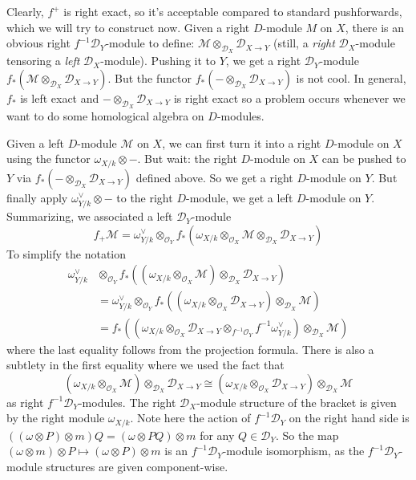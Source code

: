 \documentclass[11pt, a4paper]{article}
\theoremstyle{definition}
\newcommand{\w}[0]{\omega}
\begin{document}
    Clearly, $f^+$ is right exact, so it's acceptable compared to standard pushforwards, which we will try to construct now. Given a right $D$-module $M$ on $X$, there is an obvious right $f^{-1}\mathcal D_Y$-module to define: $\mathcal M\otimes_{\mathcal D_X}\mathcal D_{X\to Y}$ (still, a \textit{right} $\mathcal D_X$-module tensoring a \textit{left} $\mathcal D_X$-module). Pushing it to $Y$, we get a right $\mathcal D_Y$-module $f_*(\mathcal M\otimes_{\mathcal D_X}\mathcal D_{X\to Y})$. But the functor $f_*(-\otimes_{\mathcal D_X}\mathcal D_{X\to Y})$ is not cool. In general, $f_*$ is left exact and $-\otimes_{\mathcal D_X}\mathcal D_{X\to Y}$ is right exact so a problem occurs whenever we want to do some homological algebra on $D$-modules.

    Given a left $D$-module $\mathcal M$ on $X$, we can first turn it into a right $D$-module on $X$ using the functor $\w_{X/k}\otimes-$. But wait: the right $D$-module on $X$ can be pushed to $Y$ via $f_*(-\otimes_{\mathcal D_X}\mathcal D_{X\to Y})$ defined above. So we get a right $D$-module on $Y$. But finally apply $\w_{Y/k}^\vee\otimes-$ to the right $D$-module, we get a left $D$-module on $Y$. Summarizing, we associated a left $\mathcal D_Y$-module
    \[f_+\mathcal M=\w_{Y/k}^\vee\otimes_{\mathcal O_Y}f_*(\w_{X/k}\otimes_{\mathcal O_X} \mathcal M\otimes_{\mathcal D_X}\mathcal D_{X\to Y})\]
    To simplify the notation
    \begin{align*}
        \w_{Y/k}^\vee&\otimes_{\mathcal O_Y}f_*((\w_{X/k}\otimes_{\mathcal O_X} \mathcal M)\otimes_{\mathcal D_X}\mathcal D_{X\to Y})\\
        &=\w_{Y/k}^\vee\otimes_{\mathcal O_Y}f_*((\w_{X/k}\otimes_{\mathcal O_X}\mathcal D_{X\to Y})\otimes_{\mathcal D_X} \mathcal M)\\
        &=f_*((\w_{X/k}\otimes_{\mathcal O_X}\mathcal D_{X\to Y}\otimes_{f^{-1}\mathcal O_Y}f^{-1}\w_{Y/k}^\vee)\otimes_{\mathcal D_X} \mathcal M)
    \end{align*}
    where the last equality follows from the projection formula. There is also a subtlety in the first equality where we used the fact that
    \[(\w_{X/k}\otimes_{\mathcal O_X} \mathcal M)\otimes_{\mathcal D_X}\mathcal D_{X\to Y}\cong (\w_{X/k}\otimes_{\mathcal O_X}\mathcal D_{X\to Y})\otimes_{\mathcal D_X} \mathcal M\]
    as right $f^{-1}\mathcal D_Y$-modules. The right $\mathcal D_X$-module structure of the bracket is given by the right module $\w_{X/k}$. Note here the action of $f^{-1}\mathcal D_Y$ on the right hand side is $((\w\otimes P)\otimes m)Q=(\w\otimes PQ)\otimes m$ for any $Q\in\mathcal D_Y$. So the map $(\w\otimes m)\otimes P\mapsto (\w\otimes P)\otimes m$ is an $f^{-1}\mathcal D_Y$-module isomorphism, as the $f^{-1}\mathcal D_Y$-module structures are given component-wise.
\end{document}
